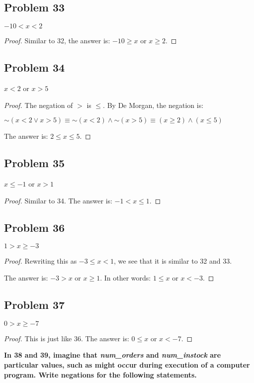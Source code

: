 \documentclass[14pt]{extarticle}
\begin{document}
\subsection{Problem 33}
$-10 < x < 2$

\begin{proof}
Similar to 32, the answer is: $-10 \geq x$ or $x \geq 2$.
\end{proof}

\subsection{Problem 34}
$x < 2$ or $x > 5$

\begin{proof}
The negation of $>$ is $\leq$. By De Morgan, the negation is:

${\sim(x < 2 \vee x > 5)} \equiv {\sim (x < 2)} \wedge {\sim (x > 5)} \equiv (x
\geq 2) \wedge (x \leq 5)$

The answer is: $2 \leq x \leq 5$.
\end{proof}

\subsection{Problem 35}
$x \leq -1$ or $x > 1$

\begin{proof}
Similar to 34. The answer is: $-1 < x \leq 1$.
\end{proof}

\subsection{Problem 36}
$1 > x \geq -3$

\begin{proof}
Rewriting this as $-3 \leq x < 1$, we see that it is similar to 32 and 33.

The answer is: $-3 > x$ or $x \geq 1$. In other words: $1 \leq x$ or $x < -3$.
\end{proof}

\subsection{Problem 37}
$0 > x \geq -7$

\begin{proof}
This is just like 36. The answer is: $0 \leq x$ or $x < -7$.
\end{proof}

{\bf In 38 and 39, imagine that {\it num\_orders} and {\it num\_instock} are
particular values, such as might occur during execution of a computer program.
Write negations for the following statements.}
\end{document}
